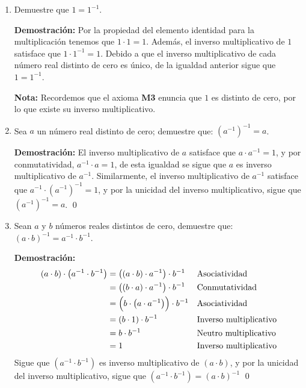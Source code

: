 \documentclass[11pt]{article}
\begin{document}
\begin{enumerate}[label=\alph*)]
        \item Demuestre que $1=1^{-1}$.
        
        \textbf{Demostración:} Por la propiedad del elemento identidad para la multiplicación tenemos que $1\cdot 1 = 1$. Además, el inverso multiplicativo de $1$ satisface que $1 \cdot 1^{-1}=1$. Debido a que el inverso multiplicativo de cada número real distinto de cero es único, de la igualdad anterior sigue que $1=1^{-1}$.

        \textbf{Nota:} Recordemos que el axioma \textbf{M3} enuncia que $1$ es distinto de cero, por lo que existe su inverso multiplicativo.

        \item Sea $a$ un número real distinto de cero; demuestre que: $\left( a^{-1} \right)^{-1}=a$.
        
        \textbf{Demostración:} El inverso multiplicativo de $a$ satisface que $a\cdot a^{-1}=1$, y por conmutatividad, $a^{-1} \cdot a=1$, de esta igualdad se sigue que $a$ es inverso multiplicativo de $a^{-1}$. Similarmente, el inverso multiplicativo de $a^{-1}$ satisface que $ a^{-1} \cdot \left( a^{-1} \right)^{-1} =1$, y por la unicidad del inverso multiplicativo, sigue que $\left( a^{-1} \right)^{-1}=a$. \qed

        \item Sean $a$ y $b$ números reales distintos de cero, demuestre que: $(a \cdot b)^{-1}=a^{-1} \cdot b^{-1}$.
         
        \textbf{Demostración:} \begin{align*}
            \left(a \cdot b \right) \cdot  \left(a^{-1} \cdot b^{-1}  \right)	&=	 \left( \left(a \cdot b\right) \cdot a^{-1}  \right) \cdot b^{-1}  	&& \text{Asociatividad}\\
        &=	 \left( \left(b\cdot a \right) \cdot a^{-1}  \right) \cdot b^{-1}  	&& \text{Conmutatividad}\\
        &=	 \Bigl(b\cdot  \left(a \cdot a^{-1}\right) \Bigr) \cdot b^{-1}	&& \text{Asociatividad}\\
        &=	 \left(b\cdot 1 \right) \cdot b^{-1}	&& \text{Inverso multiplicativo}\\
        &=	b\cdot b^{-1}	&& \text{Neutro multiplicativo}\\
        &=	1	&& \text{Inverso multiplicativo}
        \end{align*}
        Sigue que $\left(a^{-1} \cdot b^{-1} \right)$ es inverso multiplicativo de $\left( a \cdot b\right)$, y por la unicidad del inverso multiplicativo, sigue que $\left(a^{-1} \cdot b^{-1} \right) = \left( a \cdot b\right)^{-1}$ \qed


\end{enumerate}
\end{document}

